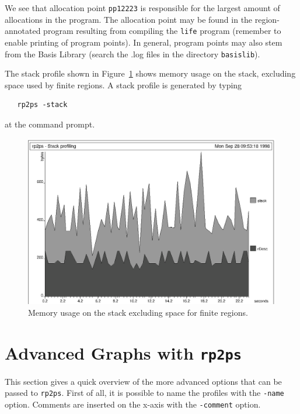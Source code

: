 \documentclass[12pt]{book}
\begin{document}
We see that allocation point \texttt{pp12223} is responsible for the
largest amount of allocations in the program. The allocation point may
be found in the region-annotated program resulting from compiling the
{\tt life} program (remember to enable printing of program points). In
general, program points may also stem from the Basis Library (search
the {.log} files in the directory {\tt basislib}).

The stack profile shown in Figure~\ref{prof_eks3.fig} shows memory
usage on the stack, excluding space used by finite regions. A 
%
%
stack profile is generated by typing
\begin{verbatim}
   rp2ps -stack
\end{verbatim}
at the command prompt.

\begin{figure}
\begin{center}
\includegraphics{prof_eks3.ps}
\end{center}
\caption{Memory usage on the stack excluding space for finite regions.}
\label{prof_eks3.fig}
\end{figure}

\section{Advanced Graphs with \texttt{rp2ps}}
This section gives a quick overview of the more advanced options that can
be passed to \texttt{rp2ps}. First of all, it is possible to name the
profiles with the 
%
{\tt -name} option. Comments are inserted on the
x-axis with the 
%
{\tt -comment} option.
\end{document}
